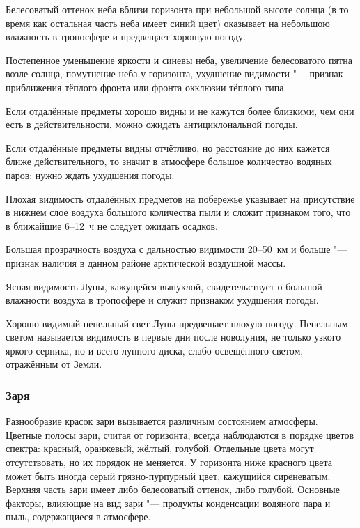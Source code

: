  Белесоватый оттенок неба вблизи горизонта при небольшой высоте
солнца (в то время как остальная часть неба имеет синий цвет)
оказывает на небольшою влажность в тропосфере и предвещает хорошую
погоду.

 Постепенное уменьшение яркости и синевы неба, увеличение
белесоватого пятна возле солнца, помутнение неба у горизонта,
ухудшение видимости "--- признак приближения тёплого фронта или фронта
окклюзии тёплого типа.

 Если отдалённые предметы хорошо видны и не кажутся более
близкими, чем они есть в действительности, можно ожидать
антициклональной погоды.

 Если отдалённые предметы видны отчётливо, но расстояние до них
кажется ближе действительного, то значит в атмосфере большое
количество водяных паров: нужно ждать ухудшения погоды.

 Плохая видимость отдалённых предметов на побережье указывает
на присутствие в нижнем слое воздуха большого количества пыли и сложит
признаком того, что в ближайшие 6--12~ч не следует ожидать осадков.

 Большая прозрачность воздуха с дальностью видимости 20--50~км
и больше "--- признак наличия в данном районе арктической воздушной
массы.

 Ясная видимость Луны, кажущейся выпуклой, свидетельствует о
большой влажности воздуха в тропосфере и служит признаком ухудшения
погоды.

 Хорошо видимый пепельный свет Луны предвещает плохую
погоду. Пепельным светом называется видимость в первые дни после
новолуния, не только узкого яркого серпика, но и всего лунного диска,
слабо освещённого светом, отражённым от Земли.

\subsubsection{Заря}

Разнообразие красок зари вызывается различным состоянием
атмосферы. Цветные полосы зари, считая от горизонта, всегда
наблюдаются в порядке цветов спектра: красный, оранжевый, жёлтый,
голубой. Отдельные цвета могут отсутствовать, но их порядок не
меняется. У горизонта ниже красного цвета может быть иногда серый
грязно-пурпурный цвет, кажущийся сиреневатым. Верхняя часть зари имеет
либо белесоватый оттенок, либо голубой. Основные факторы, влияющие на
вид зари "--- продукты конденсации водяного пара и пыль, содержащиеся в
атмосфере.


